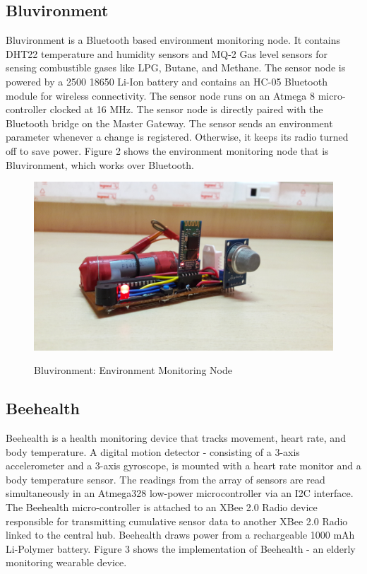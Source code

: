 \subsection{Bluvironment}
Bluvironment is a Bluetooth based environment monitoring node. It contains DHT22 temperature and humidity sensors and MQ-2 Gas level sensors for sensing combustible gases like LPG, Butane, and Methane. The sensor node is powered by a 2500 18650 Li-Ion battery and contains an HC-05 Bluetooth module for wireless connectivity. The sensor node runs on an Atmega 8 micro-controller clocked at 16 MHz. The sensor node is directly paired with the Bluetooth bridge on the Master Gateway. The sensor sends an environment parameter whenever a change is registered. Otherwise, it keeps its radio turned off to save power. Figure 2 shows the environment monitoring node that is Bluvironment, which works over Bluetooth.
\begin{figure}
\includegraphics[scale=0.08]{images/environment_monitoring.jpg}
\label{fig:2}
\caption{Bluvironment: Environment Monitoring Node}
\end{figure}

\subsection{Beehealth}
Beehealth is a health monitoring device that tracks movement, heart rate, and body temperature. A digital motion detector - consisting of a 3-axis accelerometer and a 3-axis gyroscope, is mounted with a heart rate monitor and a body temperature sensor. The readings from the array of sensors are read simultaneously in an Atmega328 low-power microcontroller via an I2C interface. The Beehealth micro-controller is attached to an XBee 2.0 Radio device responsible for transmitting cumulative sensor data to another XBee 2.0 Radio linked to the central hub. Beehealth draws power from a rechargeable 1000 mAh Li-Polymer battery. Figure 3 shows the implementation of Beehealth - an elderly monitoring wearable device.

